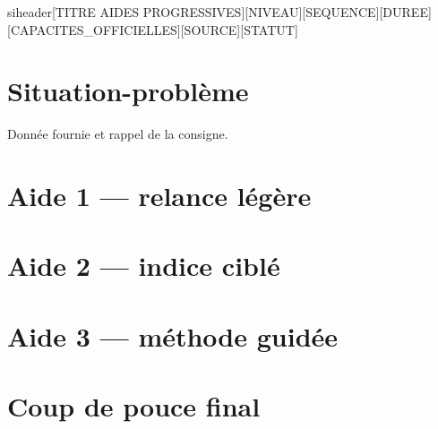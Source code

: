 \documentclass[a4paper,11pt]{article}
\begin{document}
siheader{[TITRE AIDES PROGRESSIVES]}{[NIVEAU]}{[SEQUENCE]}{[DUREE]}{[CAPACITES\_OFFICIELLES]}{[SOURCE]}{[STATUT]}
\section*{Situation-problème}
Donnée fournie et rappel de la consigne.
\section*{Aide 1 — relance légère}
\section*{Aide 2 — indice ciblé}
\section*{Aide 3 — méthode guidée}
\section*{Coup de pouce final}
\end{document}
